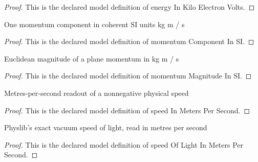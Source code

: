 \begin{proof}
  This is the declared model definition of energy In Kilo Electron Volts.
\end{proof}
\begin{definition}
  \label{def:physics:phyx-mini-0569:phyxminiproblems-problemphyxmini0569-momentumcomponentinsi}
  One momentum component in coherent SI units kg m / s
\end{definition}
\begin{proof}
  This is the declared model definition of momentum Component In SI.
\end{proof}
\begin{definition}
  \label{def:physics:phyx-mini-0569:phyxminiproblems-problemphyxmini0569-momentummagnitudeinsi}
  Euclidean magnitude of a plane momentum in kg m / s
\end{definition}
\begin{proof}
  This is the declared model definition of momentum Magnitude In SI.
\end{proof}
\begin{definition}
  \label{def:physics:phyx-mini-0569:phyxminiproblems-problemphyxmini0569-speedinmeterspersecond}
  Metres-per-second readout of a nonnegative physical speed
\end{definition}
\begin{proof}
  This is the declared model definition of speed In Meters Per Second.
\end{proof}
\begin{definition}
  \label{def:physics:phyx-mini-0569:phyxminiproblems-problemphyxmini0569-speedoflightinmeterspersecond}
  Physlib's exact vacuum speed of light, read in metres per second
\end{definition}
\begin{proof}
  This is the declared model definition of speed Of Light In Meters Per Second.
\end{proof}

